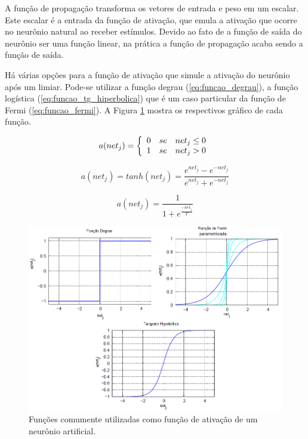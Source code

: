 \documentclass[12pt,a4paper]{report}
\begin{document}
	A função de propagação transforma os vetores de entrada e peso em um escalar. Este escalar é a entrada da função de ativação, que emula a ativação que ocorre no neurônio natural ao receber estímulos. Devido ao fato de a função de saída do neurônio ser uma função linear, na prática a função de propagação acaba sendo a função de saída.
	
	Há várias opções para a função de ativação que simule a ativação do neurônio após um limiar. Pode-se utilizar a função degrau (\ref{eq:funcao_degrau}), a função logística (\ref{eq:funcao_tg_hiperbolica}) que é um caso particular da função de Fermi (\ref{eq:funcao_fermi}). A Figura \ref{fig:FuncoesAtivacoes} mostra os respectivos gráfico de cada função.
	
	\begin{equation}
	a(net_j)=\left \{ 
	\begin{array}{l c l}
	0 & se & net_j \leq 0 \\ 
	1 & se & net_j > 0
	\end{array}
	\right.
	\label{eq:funcao_degrau}
	\end{equation}
	
	\begin{equation}
	a(net_j)=tanh(net_j)=\frac{e^{net_j}-e^{-net_j}}{e^{net_j}+e^{-net_j}}
	\label{eq:funcao_tg_hiperbolica}
	\end{equation}
	
	\begin{equation}
	a(net_j)=\frac{1}{1+e^{\frac{-net_j}{T}}}
	\label{eq:funcao_fermi}
	\end{equation}
	
	\begin{figure}[H]
		\centering
		\includegraphics[scale=0.53]{./img/funcoes_ativacoes.png}
		\caption{Funções comumente utilizadas como função de ativação de um neurônio artificial.}
		\label{fig:FuncoesAtivacoes}
	\end{figure}
	
\end{document}
